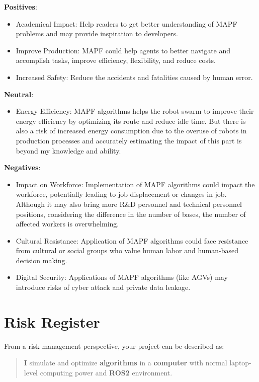 \documentclass[12pt, oneside]{article}
\begin{document}
 \vspace{0.5cm}

\textbf{Positives}:

\begin{itemize}
    \item Academical Impact: Help readers to get better understanding of MAPF problems and may provide inspiration to developers.
    \item Improve Production: MAPF could help agents to better navigate and accomplish tasks, improve efficiency, flexibility, and reduce costs.
    \item Increased Safety: Reduce the accidents and fatalities caused by human error.
\end{itemize}

\textbf{Neutral}:
 \begin{itemize}
     \item Energy Efficiency: MAPF algorithms helps the robot swarm to improve their energy efficiency by optimizing its route and reduce idle time. But there is also a risk of increased energy consumption due to the overuse of robots in production processes and accurately estimating the impact of this part is beyond my knowledge and ability.  
 \end{itemize}

\textbf{Negatives}:

\begin{itemize}
    \item Impact on Workforce: Implementation of MAPF algorithms could impact the workforce, potentially leading to job displacement or changes in job. Although it may also bring more R\&D personnel and technical personnel positions, considering the difference in the number of bases, the number of affected workers is overwhelming.
    \item Cultural Resistance: Application of MAPF algorithms could face resistance from cultural or social groups who value human labor and human-based decision making.
    \item Digital Security: Applications of MAPF algorithms (like AGVs) may introduce risks of cyber attack and private data leakage. 
\end{itemize}

\FloatBarrier

\section{Risk Register}

From a risk management perspective, your project can be described as:
\begin{quote}
    \textbf{I} simulate and optimize \textbf{algorithms} in a \textbf{computer} with normal laptop-level computing power and \textbf{ROS2} environment.
\end{quote}
\end{document}
